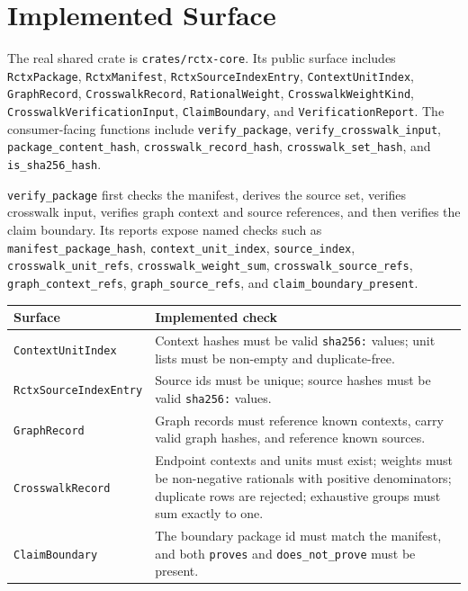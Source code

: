 \section{Implemented Surface}

The real shared crate is \texttt{crates/rctx-core}. Its public surface includes
\texttt{RctxPackage}, \texttt{RctxManifest}, \texttt{RctxSourceIndexEntry},
\texttt{ContextUnitIndex}, \texttt{GraphRecord}, \texttt{CrosswalkRecord},
\texttt{RationalWeight}, \texttt{CrosswalkWeightKind},
\texttt{CrosswalkVerificationInput}, \texttt{ClaimBoundary}, and
\texttt{VerificationReport}. The consumer-facing functions include
\texttt{verify\_package}, \texttt{verify\_crosswalk\_input},
\texttt{package\_content\_hash}, \texttt{crosswalk\_record\_hash},
\texttt{crosswalk\_set\_hash}, and \texttt{is\_sha256\_hash}.

\texttt{verify\_package} first checks the manifest, derives the source set,
verifies crosswalk input, verifies graph context and source references, and
then verifies the claim boundary. Its reports expose named checks such as
\texttt{manifest\_package\_hash}, \texttt{context\_unit\_index},
\texttt{source\_index}, \texttt{crosswalk\_unit\_refs},
\texttt{crosswalk\_weight\_sum}, \texttt{crosswalk\_source\_refs},
\texttt{graph\_context\_refs}, \texttt{graph\_source\_refs}, and
\texttt{claim\_boundary\_present}.

\begin{center}
\small
\begin{tabularx}{\textwidth}{lX}
\toprule
Surface & Implemented check \\
\midrule
\texttt{ContextUnitIndex} & Context hashes must be valid \texttt{sha256:} values; unit lists must be non-empty and duplicate-free. \\
\texttt{RctxSourceIndexEntry} & Source ids must be unique; source hashes must be valid \texttt{sha256:} values. \\
\texttt{GraphRecord} & Graph records must reference known contexts, carry valid graph hashes, and reference known sources. \\
\texttt{CrosswalkRecord} & Endpoint contexts and units must exist; weights must be non-negative rationals with positive denominators; duplicate rows are rejected; exhaustive groups must sum exactly to one. \\
\texttt{ClaimBoundary} & The boundary package id must match the manifest, and both \texttt{proves} and \texttt{does\_not\_prove} must be present. \\
\bottomrule
\end{tabularx}
\end{center}

